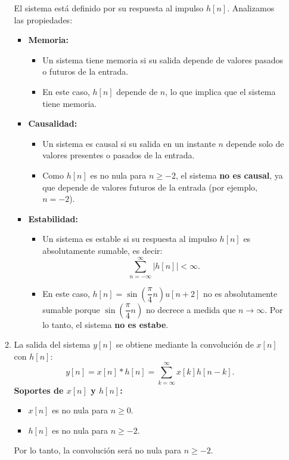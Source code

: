 \begin{enumerate}[label=\color{red}\textbf{\arabic*)}]
\begin{enumerate}[label=\color{red}\textbf{\alph*)}]
            El sistema está definido por su respuesta al impulso $h[n]$. Analizamos las propiedades:
             \begin{itemize}[label=\textbullet]
                \item \textbf{Memoria:}
                    \begin{itemize}[label=\textbullet]
                        \item Un sistema tiene memoria si su salida depende de valores pasados o futuros de la entrada.
                        \item En este caso, $h[n]$ depende de  $n$, lo que implica que el sistema tiene memoria.
                    \end{itemize}
                \item \textbf{Causalidad:}
                    \begin{itemize}[label=\textbullet]
                        \item Un sistema es causal si su salida en un instante $n$ depende solo de valores presentes o pasados de la entrada.
                        \item Como $h[n]$ es no nula para $n\ge -2$, el sistema \textbf{no es causal}, ya que depende de valores futuros de la entrada (por ejemplo, $n=-2$). 
                    \end{itemize}
                \item \textbf{Estabilidad:}
                    \begin{itemize}[label=\textbullet]
                        \item Un sistema es estable si su respuesta al impulso $h[n]$ es absolutamente sumable, es decir:  \[
                                \sum_{n=-\infty}^{\infty} |h[n]|<\infty.
                        \] 
                    \item En este caso, $h[n]=\sin\left( \dfrac{\pi}{4}n \right) u[n+2]$ no es absolutamente sumable porque $\sin\left( \dfrac{\pi}{4}n \right) $ no decrece a medida que $n\to \infty$. Por lo tanto, el sistema \textbf{no es estabe}. 
                    \end{itemize}
            \end{itemize}
        \item {}

            La salida del sistema $y[n]$ se obtiene mediante la convolución de  $x[n]$ con  $h[n]$:  \[
                y[n]=x[n]\ast h[n]=\sum_{k=\infty}^{\infty} x[k]h[n-k].
            \] 
            \textbf{Soportes de $x[n]$ y  $h[n]$:}
            \begin{itemize}[label=\textbullet]
                \item $x[n]$ es no nula para  $n\ge 0$.
                \item $h[n]$ es no nula para  $n\ge -2$.
            \end{itemize}
            Por lo tanto, la convolución será no nula para $n\ge -2$.


\end{enumerate}
\end{enumerate}
